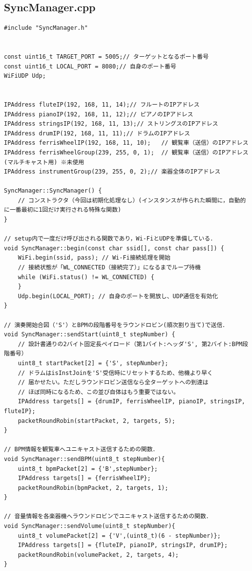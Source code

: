\subsection{SyncManager.cpp}
\begin{lstlisting}[caption={SyncManager.cpp}, label={lst:siki_sync_cpp}]
#include "SyncManager.h"


const uint16_t TARGET_PORT = 5005;// ターゲットとなるポート番号
const uint16_t LOCAL_PORT = 8080;// 自身のポート番号
WiFiUDP Udp;


IPAddress fluteIP(192, 168, 11, 14);// フルートのIPアドレス
IPAddress pianoIP(192, 168, 11, 12);// ピアノのIPアドレス
IPAddress stringsIP(192, 168, 11, 13);// ストリングスのIPアドレス
IPAddress drumIP(192, 168, 11, 11);// ドラムのIPアドレス
IPAddress ferrisWheelIP(192, 168, 11, 10);   // 観覧車（送信）のIPアドレス
IPAddress ferrisWheelGroup(239, 255, 0, 1);  // 観覧車（送信）のIPアドレス(マルチキャスト用) ※未使用
IPAddress instrumentGroup(239, 255, 0, 2);// 楽器全体のIPアドレス

SyncManager::SyncManager() {
    // コンストラクタ（今回は初期化処理なし）(インスタンスが作られた瞬間に，自動的に一番最初に1回だけ実行される特殊な関数)
}

// setup内で一度だけ呼び出される関数であり，Wi-FiとUDPを準備している．
void SyncManager::begin(const char ssid[], const char pass[]) {
    WiFi.begin(ssid, pass); // Wi-Fi接続処理を開始
    // 接続状態が「WL_CONNECTED（接続完了）」になるまでループ待機
    while (WiFi.status() != WL_CONNECTED) {
    }
    Udp.begin(LOCAL_PORT); // 自身のポートを開放し、UDP通信を有効化
}

// 演奏開始合図（'S'）とBPMの段階番号をラウンドロビン(順次割り当て)で送信．
void SyncManager::sendStart(uint8_t stepNumber) {
    // 設計書通りの2バイト固定長ペイロード（第1バイト:ヘッダ'S', 第2バイト:BPM段階番号）
    uint8_t startPacket[2] = {'S', stepNumber};
    // ドラムはisInstJoinを'S'受信時にリセットするため、他機より早く
    // 届かせたい。ただしラウンドロビン送信なら全ターゲットへの到達は
    // ほぼ同時になるため、この並び自体はもう重要ではない。
    IPAddress targets[] = {drumIP, ferrisWheelIP, pianoIP, stringsIP, fluteIP};
    packetRoundRobin(startPacket, 2, targets, 5);
}

// BPM情報を観覧車へユニキャスト送信するための関数．
void SyncManager::sendBPM(uint8_t stepNumber){
    uint8_t bpmPacket[2] = {'B',stepNumber};
    IPAddress targets[] = {ferrisWheelIP};
    packetRoundRobin(bpmPacket, 2, targets, 1);
}

// 音量情報を各楽器機へラウンドロビンでユニキャスト送信するための関数．
void SyncManager::sendVolume(uint8_t stepNumber){
    uint8_t volumePacket[2] = {'V',(uint8_t)(6 - stepNumber)};
    IPAddress targets[] = {fluteIP, pianoIP, stringsIP, drumIP};
    packetRoundRobin(volumePacket, 2, targets, 4);
}


\end{lstlisting}
